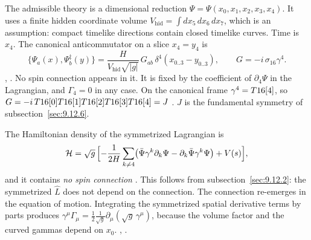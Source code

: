 The admissible theory is a dimensional reduction $\Psi=\Psi(x_0,x_1,x_2,x_3,x_4)$. It uses a finite
hidden coordinate volume $V_{\text{hid}}=\int dx_5\,dx_6\,dx_7$, which is an assumption: compact
timelike directions contain closed timelike curves. Time is $x_4$. The canonical anticommutator on
a slice $x_4=y_4$ is
\begin{equation}
  \{\Psi_a(x),\Psi^\ddagger_b(y)\}=\frac{H}{V_{\text{hid}}\sqrt{|g|}}\,G_{ab}\,\delta^4(x_{0..3}-y_{0..3}),\qquad G=-i\,\sigma_{16}\gamma^4 .
\end{equation}
 , . No spin connection appears in it. It is
fixed by the coefficient of $\partial_4\Psi$ in the Lagrangian, and $\Gamma_4=0$ in any case. On
the canonical frame $\gamma^4=T16[4]$, so
$G=-i\,T16[0]T16[1]T16[2]T16[3]T16[4]=J$ \cfderived. $J$ is the fundamental symmetry
of subsection~\ref{sec:9.12.6}.

The Hamiltonian density of the symmetrized Lagrangian is
\begin{equation}
  \mathcal H=\sqrt g\,\Bigl[-\frac{1}{2H}\sum_{k\neq4}\bigl(\bar\Psi\gamma^k\partial_k\Psi-\partial_k\bar\Psi\gamma^k\Psi\bigr)+V(s)\Bigr],
\end{equation}
and it contains \emph{no spin connection} 
. This follows from
subsection~\ref{sec:9.12.2}: the symmetrized $\hat L$ does not depend on the connection. The connection re-emerges
in the equation of motion. Integrating the symmetrized spatial derivative terms by parts produces
$\gamma^\mu\Gamma_\mu=\tfrac12\frac{1}{\sqrt g}\partial_\mu(\sqrt g\,\gamma^\mu)$, because the volume
factor and the curved gammas depend on $x_0$. 
, .

